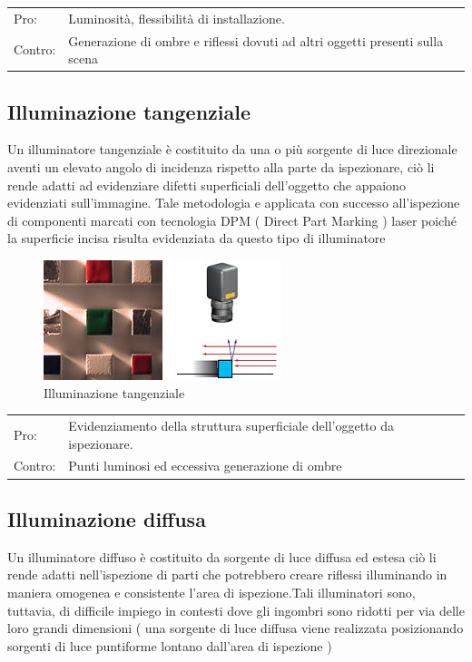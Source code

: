 \begin{centering}
\centering
\begin{tabular}{l l}
Pro: &  Luminosità, flessibilità di installazione. \\
Contro: &  Generazione di ombre e riflessi dovuti ad altri oggetti presenti sulla scena \\
\end{tabular}
\end{centering}


\subsection{Illuminazione tangenziale}

Un illuminatore tangenziale è costituito da una o più 
sorgente di luce direzionale aventi un elevato angolo di 
incidenza rispetto alla parte da ispezionare, ciò li rende 
adatti ad evidenziare difetti superficiali dell'oggetto che 
appaiono evidenziati sull'immagine.  
Tale metodologia e applicata con successo all'ispezione di 
componenti marcati con tecnologia DPM ( Direct Part 
Marking ) laser poiché la superficie incisa risulta evidenziata 
da questo tipo di illuminatore 

\begin{figure}
\centering
\includegraphics[width=.3\textwidth]{img/illuminazione-tangenziale.jpg}
\caption{Illuminazione tangenziale}\label{fig:illuminazione-tangenziale}
\end{figure}

\begin{centering}
\centering
\begin{tabular}{l l}
Pro: &  Evidenziamento della struttura superficiale dell'oggetto da ispezionare. \\
Contro: &  Punti luminosi ed eccessiva generazione di ombre \\
\end{tabular}
\end{centering}


\subsection{Illuminazione diffusa}
Un illuminatore diffuso è costituito da sorgente di luce 
diffusa ed estesa ciò li rende adatti nell'ispezione di parti 
che potrebbero creare riflessi illuminando in maniera 
omogenea e consistente l'area di ispezione.Tali illuminatori sono, tuttavia, 
di difficile impiego in contesti dove gli ingombri sono 
ridotti per via delle loro grandi dimensioni ( una sorgente di 
luce diffusa viene realizzata posizionando sorgenti di luce 
puntiforme lontano dall'area di ispezione )  
 

